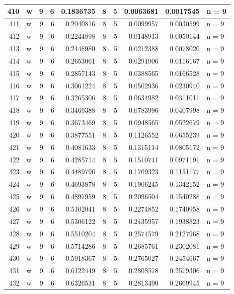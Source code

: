 \documentclass[
  letterpaper,
  DIV=11,
  numbers=noendperiod]{scrreprt}
\begin{document}
\begin{table}
\begin{tabular}[t]{r|l|r|r|r|r|r|r|r|l}
\hline
410 & w & 9 & 6 & 0.1836735 & 8 & 5 & 0.0063681 & 0.0017545 & n = 9\\
\hline
411 & w & 9 & 6 & 0.2040816 & 8 & 5 & 0.0099957 & 0.0030599 & n = 9\\
\hline
412 & w & 9 & 6 & 0.2244898 & 8 & 5 & 0.0148913 & 0.0050144 & n = 9\\
\hline
413 & w & 9 & 6 & 0.2448980 & 8 & 5 & 0.0212388 & 0.0078020 & n = 9\\
\hline
414 & w & 9 & 6 & 0.2653061 & 8 & 5 & 0.0291906 & 0.0116167 & n = 9\\
\hline
415 & w & 9 & 6 & 0.2857143 & 8 & 5 & 0.0388565 & 0.0166528 & n = 9\\
\hline
416 & w & 9 & 6 & 0.3061224 & 8 & 5 & 0.0502936 & 0.0230940 & n = 9\\
\hline
417 & w & 9 & 6 & 0.3265306 & 8 & 5 & 0.0634982 & 0.0311011 & n = 9\\
\hline
418 & w & 9 & 6 & 0.3469388 & 8 & 5 & 0.0783996 & 0.0407998 & n = 9\\
\hline
419 & w & 9 & 6 & 0.3673469 & 8 & 5 & 0.0948565 & 0.0522679 & n = 9\\
\hline
420 & w & 9 & 6 & 0.3877551 & 8 & 5 & 0.1126552 & 0.0655239 & n = 9\\
\hline
421 & w & 9 & 6 & 0.4081633 & 8 & 5 & 0.1315114 & 0.0805172 & n = 9\\
\hline
422 & w & 9 & 6 & 0.4285714 & 8 & 5 & 0.1510741 & 0.0971191 & n = 9\\
\hline
423 & w & 9 & 6 & 0.4489796 & 8 & 5 & 0.1709323 & 0.1151177 & n = 9\\
\hline
424 & w & 9 & 6 & 0.4693878 & 8 & 5 & 0.1906245 & 0.1342152 & n = 9\\
\hline
425 & w & 9 & 6 & 0.4897959 & 8 & 5 & 0.2096504 & 0.1540288 & n = 9\\
\hline
426 & w & 9 & 6 & 0.5102041 & 8 & 5 & 0.2274852 & 0.1740958 & n = 9\\
\hline
427 & w & 9 & 6 & 0.5306122 & 8 & 5 & 0.2435957 & 0.1938823 & n = 9\\
\hline
428 & w & 9 & 6 & 0.5510204 & 8 & 5 & 0.2574579 & 0.2127968 & n = 9\\
\hline
429 & w & 9 & 6 & 0.5714286 & 8 & 5 & 0.2685761 & 0.2302081 & n = 9\\
\hline
430 & w & 9 & 6 & 0.5918367 & 8 & 5 & 0.2765027 & 0.2454667 & n = 9\\
\hline
431 & w & 9 & 6 & 0.6122449 & 8 & 5 & 0.2808578 & 0.2579306 & n = 9\\
\hline
432 & w & 9 & 6 & 0.6326531 & 8 & 5 & 0.2813490 & 0.2669945 & n = 9\\

\end{tabular}
\end{table}
\end{document}
